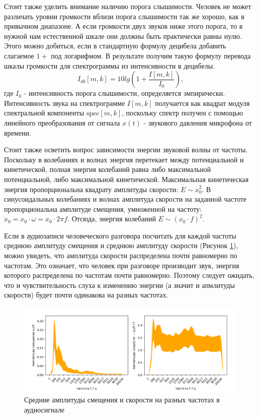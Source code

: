 Стоит также уделить внимание наличию порога слышимости. Человек не может различать уровни громкости вблизи порога слышимости так же хорошо, 
как в привычном диапазоне. А если громкости двух звуков ниже этого порога, то в нужной нам естественной шкале они должны быть практически равны нулю.
Этого можно добиться, если в стандартную формулу децибела добавить слагаемое $1 +$ под логарифмом. 
В результате получим такую формулу перевода шкалы громкости для спектрограммы из интенсивности в децибелы.
\begin{equation}
  I_{db}[m, k] = 10 lg(1 + \frac{I[m, k]}{I_0}),
\end{equation}
где $I_0$ - интенсивность порога слышимости, определяется эмпирически. Интенсивность звука на спектрограмме $I[m,k]$ получается как 
квадрат модуля спектральной компоненты $\mathrm{spec}[m,k]$, поскольку спектр получен с помощью линейного преобразования от сигнала 
$x(t)$ - звукового давления микрофона от времени.

Стоит также осветить вопрос зависимости энергии звуковой волны от частоты. Поскольку в колебаниях и волнах энергия перетекает между потенциальной и кинетической,
полная энергия колебаний равна либо максимальной потенциальной, либо максимальной кинетической. 
Максимальная кинетическая энергия пропорциональна квадрату амплитуды скорости: $E \sim \dot{x}_0^2$. 
В синусоидальных колебаниях и волнах амплитуда скорости на заданной частоте пропорциональна амплитуде смещения, 
умноженной на частоту: $\dot{x}_0 = x_0 \cdot \omega = x_0 \cdot 2\pi f$. 
Отсюда, энергия колебаний $E \sim (x_0 \cdot f)^2$.

Если в аудиозаписи человеческого разговора посчитать для каждой частоты среднюю амплитуду смещения и среднюю амплитуду скорости (Рисунок \ref{fig:spectrum_mean}), 
можно увидеть, что амплитуда скорости распределена почти равномерно по частотам. Это означает, что человек при разговоре производит звук, 
энергия которого распределена по частотам почти равномерно. Поэтому следует ожидать, 
что и чувствительность слуха к изменению энергии (а значит и апмлитуды скорости) будет почти одинакова на разных частотах.

\begin{figure}
  \centering
  \includegraphics[width=0.9\linewidth]{figures/spectrum_mean}
  \caption{Средние амплитуды смещения и скорости на разных частотах в аудиосигнале}
  \label{fig:spectrum_mean}
\end{figure}


